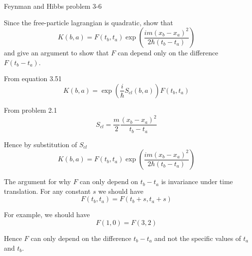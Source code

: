 \documentclass[12pt]{article}
\begin{document}
\begin{center}
Feynman and Hibbs problem 3-6
\end{center}

Since the free-particle lagrangian is quadratic, show that
\begin{equation*}
K(b,a)=F(t_b,t_a)\exp\left(\frac{im(x_b-x_a)^2}{2\hbar(t_b-t_a)}\right)
\end{equation*}
and give an argument to show that $F$ can depend only on the difference $F(t_b-t_a)$.

\bigskip
From equation 3.51
\begin{equation*}
K(b,a)=\exp\left(\frac{i}{\hbar}S_{cl}(b,a)\right)F(t_b,t_a)
\end{equation*}

From problem 2.1
\begin{equation*}
S_{cl}=\frac{m}{2}\frac{(x_b-x_a)^2}{t_b-t_a}
\end{equation*}

Hence by substitution of $S_{cl}$
\begin{equation*}
K(b,a)=F(t_b,t_a)\exp\left(\frac{im(x_b-x_a)^2}{2\hbar(t_b-t_a)}\right)
\end{equation*}

The argument for why $F$ can only depend on $t_b-t_a$ is invariance under time translation.
For any constant $s$ we should have
\begin{equation*}
F(t_b,t_a)=F(t_b+s,t_a+s)
\end{equation*}

For example, we should have
\begin{equation*}
F(1,0)=F(3,2)
\end{equation*}

Hence $F$ can only depend on the difference $t_b-t_a$ and not the specific values of $t_a$ and $t_b$.
\end{document}
